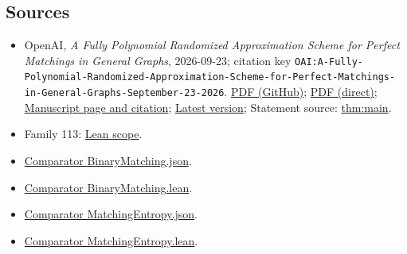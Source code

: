 \documentclass[11pt]{article}
\begin{document}
\subsection{Sources}
\begin{itemize}
\item OpenAI, \emph{A Fully Polynomial Randomized Approximation Scheme for Perfect Matchings in General Graphs}, 2026-09-23; citation key \texttt{OAI:A-Fully-Polynomial-Randomized-Approximation-Scheme-for-Perfect-Matchings-in-General-Graphs-September-23-2026}. \href{https://github.com/openai/math/blob/adc7f1241b42e322a6451854ab7e4b4c146bf78a/preprints/A-Fully-Polynomial-Randomized-Approximation-Scheme-for-Perfect-Matchings-in-General-Graphs-September-23-2026/main.pdf}{PDF (GitHub)}; \href{https://github.com/openai/math/raw/adc7f1241b42e322a6451854ab7e4b4c146bf78a/preprints/A-Fully-Polynomial-Randomized-Approximation-Scheme-for-Perfect-Matchings-in-General-Graphs-September-23-2026/main.pdf}{PDF (direct)}; \href{https://github.com/openai/math/blob/adc7f1241b42e322a6451854ab7e4b4c146bf78a/preprints/A-Fully-Polynomial-Randomized-Approximation-Scheme-for-Perfect-Matchings-in-General-Graphs-September-23-2026/README.md}{Manuscript page and citation}; \href{https://github.com/openai/math/blob/main/preprints/A-Fully-Polynomial-Randomized-Approximation-Scheme-for-Perfect-Matchings-in-General-Graphs-September-23-2026/main.pdf}{Latest version}; Statement source: \href{https://github.com/openai/math/blob/adc7f1241b42e322a6451854ab7e4b4c146bf78a/preprints/A-Fully-Polynomial-Randomized-Approximation-Scheme-for-Perfect-Matchings-in-General-Graphs-September-23-2026/build/main.tex\#L132}{thm:main}.
\item Family 113: \href{https://github.com/openai/math/blob/adc7f1241b42e322a6451854ab7e4b4c146bf78a/lean/docs/113.md}{Lean scope}.
\item \href{https://github.com/openai/math/blob/adc7f1241b42e322a6451854ab7e4b4c146bf78a/lean/ComparatorChallenges/BinaryMatching.json}{Comparator BinaryMatching.json}.
\item \href{https://github.com/openai/math/blob/adc7f1241b42e322a6451854ab7e4b4c146bf78a/lean/ComparatorChallenges/BinaryMatching.lean}{Comparator BinaryMatching.lean}.
\item \href{https://github.com/openai/math/blob/adc7f1241b42e322a6451854ab7e4b4c146bf78a/lean/ComparatorChallenges/MatchingEntropy.json}{Comparator MatchingEntropy.json}.
\item \href{https://github.com/openai/math/blob/adc7f1241b42e322a6451854ab7e4b4c146bf78a/lean/ComparatorChallenges/MatchingEntropy.lean}{Comparator MatchingEntropy.lean}.

\end{itemize}
\end{document}
